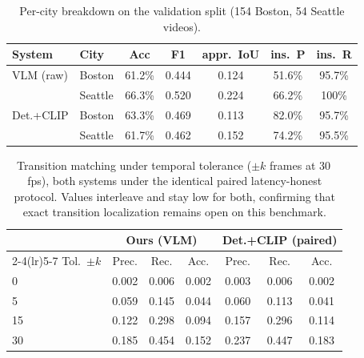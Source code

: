\documentclass[10pt,twocolumn,letterpaper]{article}
\begin{document}
\begin{table}[t]
\centering\footnotesize\setlength{\tabcolsep}{2.5pt}
\begin{tabular}{@{}llccccc@{}}
\toprule
System & City & Acc & F1 & appr.\ IoU & ins.\ P & ins.\ R \\
\midrule
VLM (raw)    & Boston  & 61.2\% & 0.444 & 0.124 & 51.6\% & 95.7\% \\
             & Seattle & 66.3\% & 0.520 & 0.224 & 66.2\% & 100\% \\
Det.+CLIP    & Boston  & 63.3\% & 0.469 & 0.113 & 82.0\% & 95.7\% \\
             & Seattle & 61.7\% & 0.462 & 0.152 & 74.2\% & 95.5\% \\
\bottomrule
\end{tabular}
\caption{Per-city breakdown on the validation split (154 Boston, 54 Seattle videos).}
\label{supp:tab:city}
\end{table}

\begin{table}[t]
\centering\small\setlength{\tabcolsep}{3.5pt}
\begin{tabular}{@{}lcccccc@{}}
\toprule
& \multicolumn{3}{c}{Ours (VLM)} & \multicolumn{3}{c}{Det.+CLIP (paired)} \\
\cmidrule(lr){2-4}\cmidrule(lr){5-7}
Tol.\ $\pm k$ & Prec. & Rec. & Acc. & Prec. & Rec. & Acc. \\
\midrule
0  & 0.002 & 0.006 & 0.002 & 0.003 & 0.006 & 0.002 \\
5  & 0.059 & 0.145 & 0.044 & 0.060 & 0.113 & 0.041 \\
15 & 0.122 & 0.298 & 0.094 & 0.157 & 0.296 & 0.114 \\
30 & 0.185 & 0.454 & 0.152 & 0.237 & 0.447 & 0.183 \\
\bottomrule
\end{tabular}
\caption{Transition matching under temporal tolerance ($\pm k$ frames at 30\,fps), both systems under the identical paired latency-honest protocol. Values interleave and stay low for both, confirming that exact transition localization remains open on this benchmark.}
\label{supp:tab:tolerance}
\end{table}

{\small\raggedright
{}

}
\end{document}
